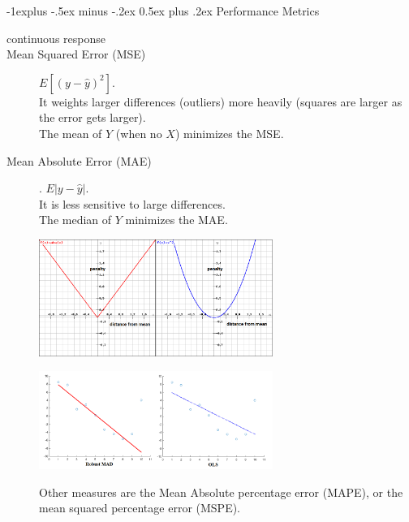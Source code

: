 \documentclass[10pt,landscape]{article}
\makeatletter
\renewcommand{\subsection}{\@startsection{subsection}{2}{0mm}%
                                {-1explus -.5ex minus -.2ex}%
                                {0.5ex plus .2ex}%
                                {\normalfont\normalsize\bfseries}}
\makeatother
\begin{document}
\begin{multicols*}{3}
    \subsection{Performance Metrics}

    \begin{description}

    \item[continuous response]

    \item[Mean Squared Error (MSE)] $E\left[(y-\hat{y})^2 \right]$.  \\
    It weights larger differences (outliers) more heavily
    (squares are larger as the error gets larger). \\
    The mean of $Y$ (when no $X$) minimizes the MSE. \\

    \item[Mean Absolute Error (MAE)]. $E\left|y-\hat{y}\right|$. \\
    It is less sensitive to large differences. \\
    The median of $Y$ minimizes the MAE. \\

    \begin{minipage}{\linewidth}
        \centering
        \includegraphics[width=3in]{figures/mse1.png}
    \end{minipage}

    \begin{minipage}{\linewidth}
        \centering
        \includegraphics[width=3in]{figures/mse2.png}
    \end{minipage}

    Other measures are the Mean Absolute percentage error (MAPE),
    or the mean squared percentage error (MSPE). \\


\end{description}
\end{multicols*}
\end{document}
